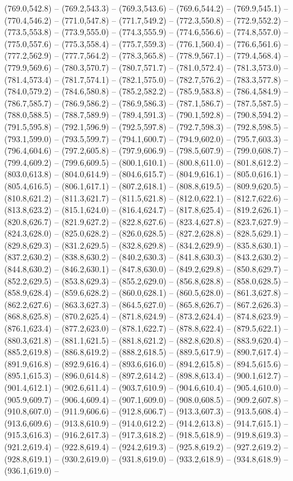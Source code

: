 (769.0,542.8) -- (769.2,543.3) -- (769.3,543.6) -- (769.6,544.2) -- (769.9,545.1) -- (770.4,546.2) -- (771.0,547.8) -- (771.7,549.2) -- (772.3,550.8) -- (772.9,552.2) -- (773.5,553.8) -- (773.9,555.0) -- (774.3,555.9) -- (774.6,556.6) -- (774.8,557.0) -- (775.0,557.6) -- (775.3,558.4) -- (775.7,559.3) -- (776.1,560.4) -- (776.6,561.6) -- (777.2,562.9) -- (777.7,564.2) -- (778.3,565.8) -- (778.9,567.1) -- (779.4,568.4) -- (779.9,569.6) -- (780.3,570.7) -- (780.7,571.7) -- (781.0,572.4) -- (781.3,573.0) -- (781.4,573.4) -- (781.7,574.1) -- (782.1,575.0) -- (782.7,576.2) -- (783.3,577.8) -- (784.0,579.2) -- (784.6,580.8) -- (785.2,582.2) -- (785.9,583.8) -- (786.4,584.9) -- (786.7,585.7) -- (786.9,586.2) -- (786.9,586.3) -- (787.1,586.7) -- (787.5,587.5) -- (788.0,588.5) -- (788.7,589.9) -- (789.4,591.3) -- (790.1,592.8) -- (790.8,594.2) -- (791.5,595.8) -- (792.1,596.9) -- (792.5,597.8) -- (792.7,598.3) -- (792.8,598.5) -- (793.1,599.0) -- (793.5,599.7) -- (794.1,600.7) -- (794.9,602.0) -- (795.7,603.3) -- (796.4,604.6) -- (797.2,605.8) -- (797.9,606.9) -- (798.5,607.9) -- (799.0,608.7) -- (799.4,609.2) -- (799.6,609.5) -- (800.1,610.1) -- (800.8,611.0) -- (801.8,612.2) -- (803.0,613.8) -- (804.0,614.9) -- (804.6,615.7) -- (804.9,616.1) -- (805.0,616.1) -- (805.4,616.5) -- (806.1,617.1) -- (807.2,618.1) -- (808.8,619.5) -- (809.9,620.5) -- (810.8,621.2) -- (811.3,621.7) -- (811.5,621.8) -- (812.0,622.1) -- (812.7,622.6) -- (813.8,623.2) -- (815.1,624.0) -- (816.4,624.7) -- (817.8,625.4) -- (819.2,626.1) -- (820.8,626.7) -- (821.9,627.2) -- (822.8,627.6) -- (823.4,627.8) -- (823.7,627.9) -- (824.3,628.0) -- (825.0,628.2) -- (826.0,628.5) -- (827.2,628.8) -- (828.5,629.1) -- (829.8,629.3) -- (831.2,629.5) -- (832.8,629.8) -- (834.2,629.9) -- (835.8,630.1) -- (837.2,630.2) -- (838.8,630.2) -- (840.2,630.3) -- (841.8,630.3) -- (843.2,630.2) -- (844.8,630.2) -- (846.2,630.1) -- (847.8,630.0) -- (849.2,629.8) -- (850.8,629.7) -- (852.2,629.5) -- (853.8,629.3) -- (855.2,629.0) -- (856.8,628.8) -- (858.0,628.5) -- (858.9,628.4) -- (859.6,628.2) -- (860.0,628.1) -- (860.5,628.0) -- (861.3,627.8) -- (862.2,627.6) -- (863.3,627.3) -- (864.5,627.0) -- (865.8,626.7) -- (867.2,626.3) -- (868.8,625.8) -- (870.2,625.4) -- (871.8,624.9) -- (873.2,624.4) -- (874.8,623.9) -- (876.1,623.4) -- (877.2,623.0) -- (878.1,622.7) -- (878.8,622.4) -- (879.5,622.1) -- (880.3,621.8) -- (881.1,621.5) -- (881.8,621.2) -- (882.8,620.8) -- (883.9,620.4) -- (885.2,619.8) -- (886.8,619.2) -- (888.2,618.5) -- (889.5,617.9) -- (890.7,617.4) -- (891.9,616.8) -- (892.9,616.4) -- (893.6,616.0) -- (894.2,615.8) -- (894.5,615.6) -- (895.1,615.3) -- (896.0,614.8) -- (897.2,614.2) -- (898.8,613.4) -- (900.1,612.7) -- (901.4,612.1) -- (902.6,611.4) -- (903.7,610.9) -- (904.6,610.4) -- (905.4,610.0) -- (905.9,609.7) -- (906.4,609.4) -- (907.1,609.0) -- (908.0,608.5) -- (909.2,607.8) -- (910.8,607.0) -- (911.9,606.6) -- (912.8,606.7) -- (913.3,607.3) -- (913.5,608.4) -- (913.6,609.6) -- (913.8,610.9) -- (914.0,612.2) -- (914.2,613.8) -- (914.7,615.1) -- (915.3,616.3) -- (916.2,617.3) -- (917.3,618.2) -- (918.5,618.9) -- (919.8,619.3) -- (921.2,619.4) -- (922.8,619.4) -- (924.2,619.3) -- (925.8,619.2) -- (927.2,619.2) -- (928.8,619.1) -- (930.2,619.0) -- (931.8,619.0) -- (933.2,618.9) -- (934.8,618.9) -- (936.1,619.0) -- 